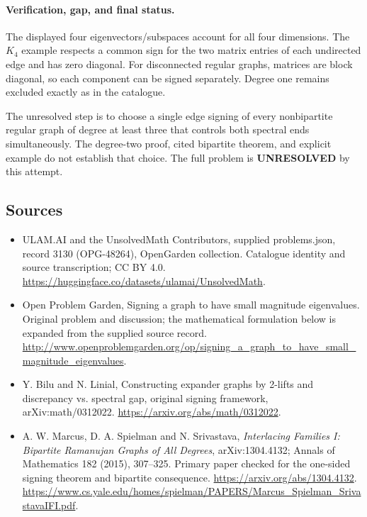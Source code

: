 \documentclass[11pt,a4paper]{article}
\begin{document}
\paragraph{Verification, gap, and final status.}
The displayed four eigenvectors/subspaces account for all four dimensions. The $K_4$ example respects a common sign for the two matrix entries of each undirected edge and has zero diagonal. For disconnected regular graphs, matrices are block diagonal, so each component can be signed separately. Degree one remains excluded exactly as in the catalogue.

The unresolved step is to choose a single edge signing of every nonbipartite regular graph of degree at least three that controls both spectral ends simultaneously. The degree-two proof, cited bipartite theorem, and explicit example do not establish that choice. The full problem is \textbf{UNRESOLVED} by this attempt.

\subsection{Sources}
\begin{itemize}
\item[S1] ULAM.AI and the UnsolvedMath Contributors, supplied problems.json, record 3130 (OPG-48264), OpenGarden collection. Catalogue identity and source transcription; CC BY 4.0.
\url{https://huggingface.co/datasets/ulamai/UnsolvedMath}.
\item[S2] Open Problem Garden, Signing a graph to have small magnitude eigenvalues. Original problem and discussion; the mathematical formulation below is expanded from the supplied source record.
\url{http://www.openproblemgarden.org/op/signing_a_graph_to_have_small_magnitude_eigenvalues}.
\item[S3] Y. Bilu and N. Linial, Constructing expander graphs by 2-lifts and discrepancy vs. spectral gap, original signing framework, arXiv:math/0312022.
\url{https://arxiv.org/abs/math/0312022}.
\item[R1] A. W. Marcus, D. A. Spielman and N. Srivastava, \emph{Interlacing Families I: Bipartite Ramanujan Graphs of All Degrees}, arXiv:1304.4132; Annals of Mathematics 182 (2015), 307--325. Primary paper checked for the one-sided signing theorem and bipartite consequence.
\url{https://arxiv.org/abs/1304.4132}.
\url{https://www.cs.yale.edu/homes/spielman/PAPERS/Marcus_Spielman_SrivastavaIFI.pdf}.
\end{itemize}
\end{document}
